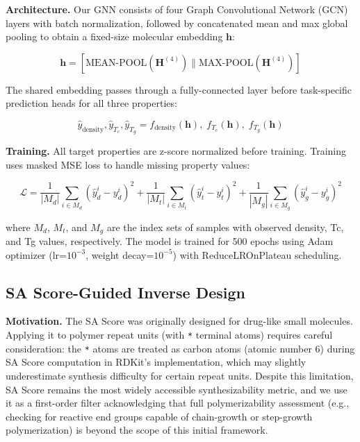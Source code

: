 \documentclass{article}
\begin{document}
\noindent\textbf{Architecture.}
Our GNN consists of four Graph Convolutional Network (GCN) layers
\citep{kipf_gcn_2017} with batch normalization, followed by concatenated
mean and max global pooling to obtain a fixed-size molecular embedding $\mathbf{h}$:

\begin{equation}
\mathbf{h} = [\text{MEAN-POOL}(\mathbf{H}^{(4)}) \| \text{MAX-POOL}(\mathbf{H}^{(4)})]
\end{equation}

The shared embedding passes through a fully-connected layer before
task-specific prediction heads for all three properties:

\begin{equation}
\hat{y}_{\text{density}}, \hat{y}_{T_c}, \hat{y}_{T_g} = 
f_{\text{density}}(\mathbf{h}),\; f_{T_c}(\mathbf{h}),\; f_{T_g}(\mathbf{h})
\end{equation}

\noindent\textbf{Training.}
All target properties are z-score normalized before training.
Training uses masked MSE loss to handle missing property values:

\begin{equation}
\mathcal{L} = \frac{1}{|M_d|}\sum_{i \in M_d}(\hat{y}^i_d - y^i_d)^2 +
              \frac{1}{|M_t|}\sum_{i \in M_t}(\hat{y}^i_t - y^i_t)^2 +
              \frac{1}{|M_g|}\sum_{i \in M_g}(\hat{y}^i_g - y^i_g)^2
\end{equation}

where $M_d$, $M_t$, and $M_g$ are the index sets of samples with observed
density, Tc, and Tg values, respectively.
The model is trained for 500 epochs using Adam optimizer
(lr=$10^{-3}$, weight decay=$10^{-5}$) with ReduceLROnPlateau scheduling.

\subsection{SA Score-Guided Inverse Design}

\noindent\textbf{Motivation.}
The SA Score \citep{ertl_sa_score_2009} was originally designed for
drug-like small molecules. Applying it to polymer repeat units (with \texttt{*}
terminal atoms) requires careful consideration: the \texttt{*} atoms are
treated as carbon atoms (atomic number 6) during SA Score computation in
RDKit's implementation, which may slightly underestimate synthesis difficulty
for certain repeat units. Despite this limitation, SA Score remains the most
widely accessible synthesizability metric, and we use it as a first-order
filter acknowledging that full polymerizability assessment (e.g., checking
for reactive end groups capable of chain-growth or step-growth polymerization)
is beyond the scope of this initial framework.
\end{document}
